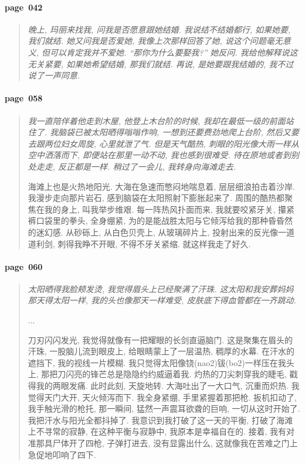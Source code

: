 \paragraph*{page~042}
\begin{quotation}
    \itshape
    晚上, 玛丽来找我, 问我是否愿意跟她结婚. 我说结不结婚都行, 如果她要, 我们就结. 她又问我是否爱她, 我像上次那样回答了她, 说这个问题毫无意义, 但可以肯定我并不爱她. ``那你为什么要娶我?'' 她反问. 我给他解释说这无关紧要, 如果她希望结婚, 那我们就结. 再说, 是她要跟我结婚的, 我不过说了一声同意. 
\end{quotation}

\paragraph*{page~058}
\begin{quotation}
    \itshape
    我一直陪伴着他走到木屋, 他登上木台阶的时候, 我却在最低一级的前面站住了. 我脑袋已被太阳晒得嗡嗡作响, 一想到还要费劲地爬上台阶, 然后又要去跟两位妇女周旋, 心里就泄了气. 但是天气酷热, 刺眼的阳光像大雨一样从空中洒落而下, 即便站在那里一动不动, 我也感到很难受. 待在原地或者到别处走走, 反正都是一样. 稍过了一会儿, 我转身向海滩走去.
    
    海滩上也是火热地阳光. 大海在急速而憋闷地喘息着, 层层细浪拍击着沙岸. 我漫步走向那片岩石, 感到脑袋在太阳照射下膨胀起来了. 周围的酷热都聚焦在我的身上, 叫我举步维艰. 每一阵热风扑面而来, 我就要咬紧牙关, 攥紧裤口袋里的拳头, 全身绷紧, 为的是能战胜太阳与它倾泻给我的那种昏昏然的迷幻感. 从砂砾上, 从白色贝壳上, 从玻璃碎片上, 投射出来的反光像一道道利剑, 刺得我睁不开眼, 不得不牙关紧缩. 就这样我走了好久. 
\end{quotation}

\paragraph*{page~060}
\begin{quotation}
    \itshape
    太阳晒得我脸颊发烫, 我觉得眉头上已经聚满了汗珠. 这太阳和我安葬妈妈那天得太阳一样, 我的头也像那天一样难受, 皮肤底下得血管都在一齐跳动.

    ... 
    
    刀刃闪闪发光, 我觉得就像有一把耀眼的长剑直逼脑门. 这是聚集在眉头的汗珠, 一股脑儿流到眼皮上, 给眼睛蒙上了一层温热, 稠厚的水幕. 在汗水的遮挡下, 我的视线一片模糊. 我只觉得太阳像铙(nao2)钹(bo2)一样压在我头上, 那把刀闪亮的锋芒总是隐隐约约威逼着我. 灼热的刀尖刺穿我的睫毛, 戳得我的两眼发痛. 此时此刻, 天旋地转. 大海吐出了一大口气, 沉重而炽热. 我觉得天门大开, 天火倾泻而下. 我全身紧绷, 手里紧握着那把枪. 扳机扣动了, 我手触光滑的枪托, 那一瞬间, 猛然一声震耳欲聋的巨响, 一切从这时开始了. 我把汗水与阳光全都抖掉了. 我意识到我打破了这一天的平衡, 打破了海滩上不寻常的寂静, 在这种平衡与寂静中, 我原本是幸福自在的. 接着, 我有对准那具尸体开了四枪, 子弹打进去, 没有显露出什么, 这就像我在苦难之门上急促地叩响了四下. 
\end{quotation}

